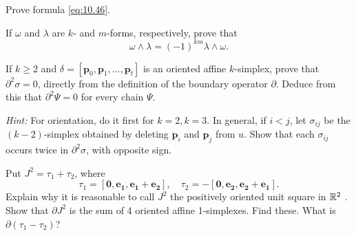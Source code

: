 \begin{myexercise}    
    \label{ex:10.14}
    Prove formula \eqref{eq:10.46}.
\end{myexercise}


\begin{myexercise}    
    \label{ex:10.15}
    If $\omega$ and $\lambda$ are $k$- and $m$-forms, respectively, prove that
    \begin{equation*}
        \omega \wedge \lambda = 
        (-1)^{km} \lambda \wedge \omega .
    \end{equation*}
\end{myexercise}


\begin{myexercise}    
    \label{ex:10.16}
    If $k \geq 2$ and $\delta = [\mathbf{p}_0, \mathbf{p}_1, ... , \mathbf{p}_t]$ is an oriented affine $k$-simplex, 
    prove that $\partial^2 \sigma = 0$, 
    directly from the definition of the boundary operator $\partial$. 
    Deduce from this that $\partial^2 \Psi = 0$ for every chain $\Psi$.
    
    \emph{Hint:} For orientation, do it first for $k= 2, k = 3$. 
    In general, if $i <j$, let $\sigma_{ij}$ be the $(k - 2)$-simplex obtained by deleting $\mathbf{p}_i$ and $\mathbf{p}_j$ from $u$. 
    Show that each $\sigma_{ij}$ occurs twice in $\partial^2 \sigma$, with opposite sign.
\end{myexercise}


\begin{myexercise}    
    \label{ex:10.17}
    Put $J^2 = \tau_1 + \tau_2$, where 
    \begin{equation*}
        \tau_1 =  \left[ \mathbf{0,e_1,e_1+e_2} \right], 
        \quad 
        \tau_2 = -\left[ \mathbf{0,e_2,e_2+e_1} \right].
    \end{equation*}
    Explain why it is reasonable to call $J^2$ the positively oriented unit square in ${\protect\mathbb R}^2$ .
    Show that $\partial J^2$ is the sum of 4 oriented affine 1-simplexes. Find these. What is $\partial (\tau_1 - \tau_2)$?
\end{myexercise}


